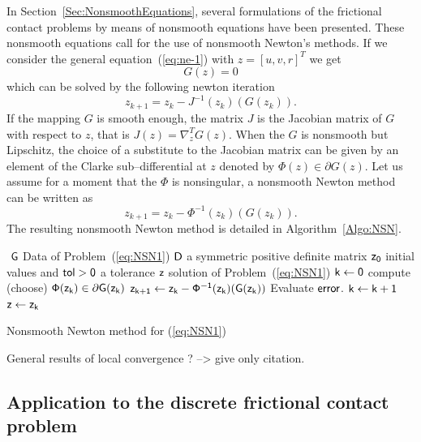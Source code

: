 In Section~\ref{Sec:NonsmoothEquations}, several formulations of the frictional contact problems by means of nonsmooth equations  have been presented. These nonsmooth equations call for the use of nonsmooth Newton's methods. If we consider the general equation~(\ref{eq:ne-1}) with $z = [u,v,r]^T$ we get
\begin{equation}
  \label{eq:NSN1}
  G(z)=0
\end{equation}
which can be solved by the following newton iteration
\begin{equation}
  \label{eq:NSN2}
  z_{k+1}  =  z_k -  J^{-1}(z_k) (G(z_k)).
\end{equation}
If the mapping $G$ is smooth enough, the matrix $J$ is the Jacobian matrix of $G$ with respect to $z$, that is $J(z) = \nabla^T_z G(z)$. When the $G$ is nonsmooth but Lipschitz,  the choice of a substitute to the Jacobian matrix can be given by an element of the Clarke sub--differential at $z$ denoted by $ \Phi(z) \in \partial G(z)$. Let us assume for a moment that the $\Phi$ is nonsingular, a nonsmooth Newton method can be written as 
\begin{equation}
  \label{eq:NSN3}
  z_{k+1}  =  z_k -  \Phi^{-1}(z_k) (G(z_k)).
\end{equation}
The resulting nonsmooth Newton method is detailed in Algorithm~\ref{Algo:NSN}.
\begin{algorithm}
  \begin{algorithmic}
    {\sf
      \STATE $ $
      \REQUIRE $\sf G $ Data of Problem~(\ref{eq:NSN1})
      \REQUIRE $\sf D$ a symmetric positive definite matrix
      \REQUIRE $\sf z_0$ initial values and $\sf tol >0$ a tolerance
      \ENSURE  $\sf z$ solution of Problem~(\ref{eq:NSN1})
      \STATE   $\sf k \leftarrow 0$ 
      \STATE compute (choose) $\sf \Phi(z_k) \in \partial G(z_k)$
      \STATE $\sf z_{k+1} \leftarrow   z_k -  \Phi^{-1}(z_k) (G(z_k))$
      \STATE Evaluate $\sf error$.
      \STATE $\sf k \leftarrow k+1$
      \ENDWHILE
      \STATE $\sf z \leftarrow z_{k}$ 
    }
  \end{algorithmic}
  \caption{Nonsmooth Newton method for (\ref{eq:NSN1})}  \label{Algo:NSN}
\end{algorithm}

\begin{ndrva}
  General results of local convergence ? --> give only citation.
\end{ndrva}
\subsection{Application to  the discrete frictional contact problem}

